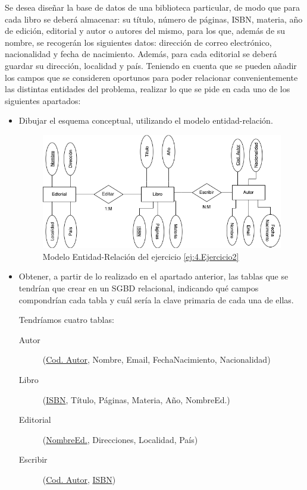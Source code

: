 \newpage
\begin{ejercicio} \label{ej:4.Ejercicio2}
Se desea diseñar la base de datos de una biblioteca particular, de modo que para cada libro se deberá almacenar: su título, número de páginas, ISBN, materia, año de edición, editorial y autor o autores del mismo, para los que, además de su nombre, se recogerán los siguientes datos: dirección de correo electrónico, nacionalidad y fecha de nacimiento. Además, para cada editorial se deberá guardar su dirección, localidad y país. Teniendo en cuenta que se pueden añadir los campos que se consideren oportunos para poder relacionar convenientemente las distintas entidades del problema, realizar lo que se pide en cada uno de los siguientes apartados:
\begin{itemize}
    \item Dibujar el esquema conceptual, utilizando el modelo entidad-relación.
    \begin{figure}[H]
        \centering
        \includegraphics[width=0.8\linewidth]{Imagenes/Ejercicio 2.png}
        \caption{Modelo Entidad-Relación del ejercicio \ref{ej:4.Ejercicio2}}
        \label{fig:Ej2}
    \end{figure}
    
    \item Obtener, a partir de lo realizado en el apartado anterior, las tablas que se tendrían que crear en un SGBD relacional, indicando qué campos compondrían cada tabla y cuál sería la clave primaria de cada una de ellas.

    Tendríamos cuatro tablas:
    \begin{description}
        \item [Autor] (\underline{Cod. Autor}, Nombre, Email, FechaNacimiento, Nacionalidad)

        \item [Libro] (\underline{ISBN}, Título, Páginas, Materia, Año, NombreEd.)

        \item [Editorial] (\underline{NombreEd.}, Direcciones, Localidad, País)

        \item [Escribir] (\underline{Cod. Autor}, \underline{ISBN})
    \end{description}
\end{itemize}
\end{ejercicio}

